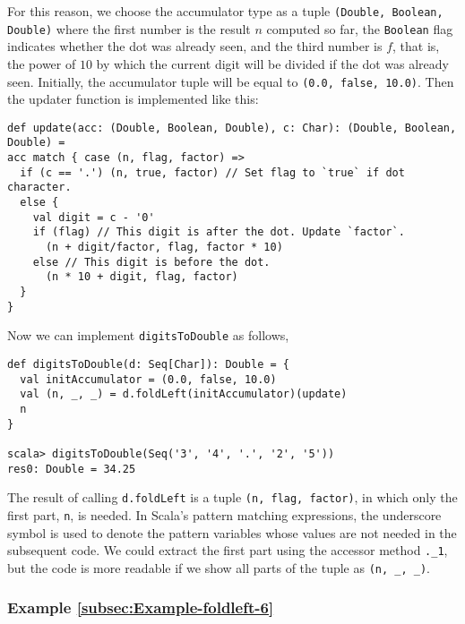For this reason, we choose the accumulator type as a tuple \lstinline!(Double, Boolean, Double)!
where the first number is the result $n$ computed so far, the \lstinline!Boolean!
flag indicates whether the dot was already seen, and the third number
is $f$, that is, the power of $10$ by which the current digit will
be divided if the dot was already seen. Initially, the accumulator
tuple will be equal to \lstinline!(0.0, false, 10.0)!.
Then the updater function is implemented like this:
\begin{lstlisting}
def update(acc: (Double, Boolean, Double), c: Char): (Double, Boolean, Double) =
acc match { case (n, flag, factor) =>
  if (c == '.') (n, true, factor) // Set flag to `true` if dot character.
  else {
    val digit = c - '0'
    if (flag) // This digit is after the dot. Update `factor`.
      (n + digit/factor, flag, factor * 10)
    else // This digit is before the dot.
      (n * 10 + digit, flag, factor)
  }
}
\end{lstlisting}
Now we can implement \lstinline!digitsToDouble!
as follows,
\begin{lstlisting}
def digitsToDouble(d: Seq[Char]): Double = {
  val initAccumulator = (0.0, false, 10.0)
  val (n, _, _) = d.foldLeft(initAccumulator)(update)
  n
}

scala> digitsToDouble(Seq('3', '4', '.', '2', '5'))
res0: Double = 34.25
\end{lstlisting}
The result of calling \lstinline!d.foldLeft!
is a tuple \lstinline!(n, flag, factor)!,
in which only the first part, \lstinline!n!,
is needed. In Scala's pattern matching expressions, the underscore
symbol is used to denote the pattern variables whose values are not
needed in the subsequent code. We could extract the first part using
the accessor method \lstinline!._1!,
but the code is more readable if we show all parts of the tuple as
\lstinline!(n, _, _)!.

\subsubsection{Example \label{subsec:Example-foldleft-6}\ref{subsec:Example-foldleft-6}}

